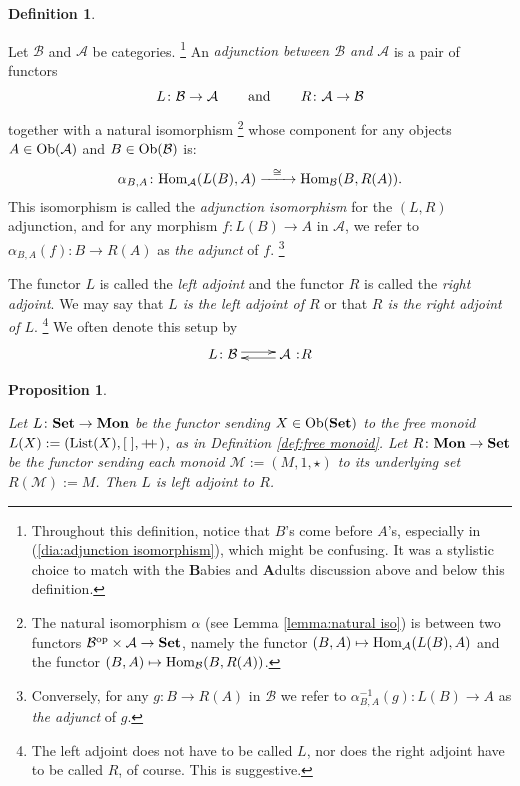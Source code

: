 \documentclass{book}
\makeatletter
\def\tn{\textnormal}
\def\mc{\mathcal}
\def\Hom{\tn{Hom}}
\def\List{\tn{List}}
\def\Ob{\tn{Ob}}
\def\hsp{\hspace{.3in}}
\def\to{\rightarrow}
\def\taking{\colon}
\def\iso{\cong}
\def\m1{{-1}}
\def\op{^\tn{op}}
\def\plpl{+\!\!+\hspace{1pt}}
\newcommand{\Too}[1]{\xrightarrow{\ \ #1\ \ }}
\newcommand{\adjoint}[4]{\xymatrix{#1\taking #2\ar@<.5ex>[r]& #3\hspace{1pt}:\hspace{-2pt} #4\ar@<.5ex>[l]}}
\def\Mon{{\bf Mon}}
\def\Set{{\bf Set}}
\def\mcA{\mc{A}}
\def\mcB{\mc{B}}
\def\mcM{\mc{M}}
\newtheorem{proposition}[subsubsection]{Proposition}
\theoremstyle{remark}
\theoremstyle{definition}
\newtheorem{definition}[subsubsection]{Definition}
\makeatother
\begin{document}
\begin{definition}\label{def:adjunction}

Let $\mcB$ and $\mcA$ be categories. \footnote{Throughout this definition, notice that $B$'s come before $A$'s, especially in (\ref{dia:adjunction isomorphism}), which might be confusing. It was a stylistic choice to match with the {\bf B}abies and {\bf A}dults discussion above and below this definition.}
An {\em adjunction between $\mcB$ and $\mcA$} is a pair of functors 
$$L\taking\mcB\to\mcA\hsp\tn{and}\hsp R\taking\mcA\to\mcB$$ 
together with a natural isomorphism
\footnote{The natural isomorphism $\alpha$ (see Lemma \ref{lemma:natural iso}) is between two functors $\mcB\op\times\mcA\to\Set$, namely the functor $(B,A)\mapsto\Hom_\mcA(L(B),A)$ and the functor $(B,A)\mapsto\Hom_\mcB(B,R(A))$.} 
whose component for any objects $A\in\Ob(\mcA)$ and $B\in\Ob(\mcB)$ is: 
\begin{align}\label{dia:adjunction isomorphism}
\alpha_{B,A}\taking\Hom_\mcA(L(B),A)\Too{\iso}\Hom_\mcB(B,R(A)).
\end{align}
This isomorphism is called the {\em adjunction isomorphism} for the $(L,R)$ adjunction, and for any morphism $f\taking L(B)\to A$ in $\mcA$, we refer to $\alpha_{B,A}(f)\taking B\to R(A)$ as {\em the adjunct} of $f$.
\footnote{Conversely, for any $g\taking B\to R(A)$ in $\mcB$ we refer to $\alpha_{B,A}^\m1(g)\taking L(B)\to A$ as {\em the adjunct} of $g$.}

The functor $L$ is called the {\em left adjoint} and the functor $R$ is called the {\em right adjoint}. We may say that {\em $L$ is the left adjoint of $R$} or that {\em $R$ is the right adjoint of $L$}. 
\footnote{The left adjoint does not have to be called $L$, nor does the right adjoint have to be called $R$, of course. This is suggestive.}
We often denote this setup by 
$$\adjoint{L}{\mcB}{\mcA}{R}$$

\end{definition}

\begin{proposition}\label{prop:free forgetful monoid}

Let $L\taking\Set\to\Mon$ be the functor sending $X\in\Ob(\Set)$ to the free monoid $L(X):=(\List(X),[\;],\plpl)$, as in Definition \ref{def:free monoid}. Let $R\taking\Mon\to\Set$ be the functor sending each monoid $\mcM:=(M,1,\star)$ to its underlying set $R(\mcM):=M$. Then $L$ is left adjoint to $R$.

\end{proposition}
\end{document}
